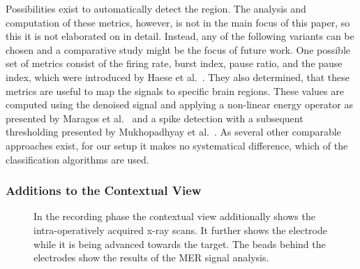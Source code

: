 \documentclass[review]{vgtc}                 %
\begin{document}
Possibilities exist to automatically detect the region. The analysis and computation of these metrics, however, is not in the main focus of this paper, so this it is not elaborated on in detail. Instead, any of the following variants can be chosen and a comparative study might be the focus of future work. One possible set of metrics consist of the firing rate, burst index, pause ratio, and the pause index, which were introduced by Haese et al.~\cite{Haese2005}. They also determined, that these metrics are useful to map the signals to specific brain regions. These values are computed using the denoised signal and applying a non-linear energy operator as presented by Maragos et al.~\cite{Maragos1993} and a spike detection with a subsequent thresholding presented by Mukhopadhyay et al.~\cite{Mukhopadhyay1998}. As several other comparable approaches exist, for our setup it makes no systematical difference, which of the classification algorithms are used.

\subsubsection{Additions to the Contextual View}\label{sec:overview:recording:3d}
\begin{figure}
    \centering
    \caption{In the recording phase the contextual view additionally shows the intra-operatively acquired x-ray scans. It further shows the electrode while it is being advanced towards the target. The beads behind the electrodes show the results of the MER signal analysis.}
    \label{fig:recordingphase:3d}
\end{figure}
\end{document}
